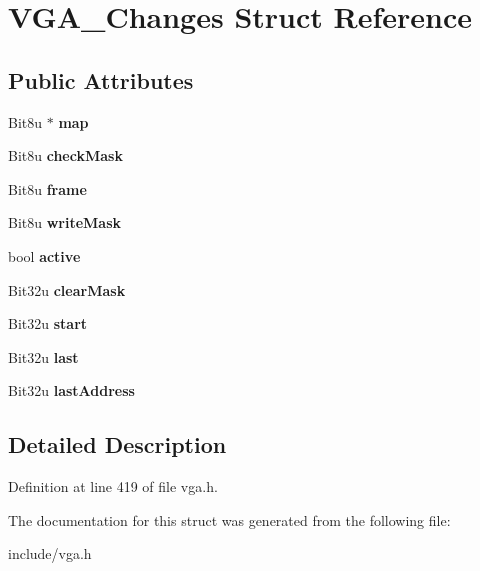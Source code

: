 \hypertarget{structVGA__Changes}{\section{V\-G\-A\-\_\-\-Changes Struct Reference}
\label{structVGA__Changes}
}
\subsection*{Public Attributes}
\begin{DoxyCompactItemize}
\item 
\hypertarget{structVGA__Changes_aae6472354347c41048cfab1219789b64}{Bit8u $\ast$ {\bfseries map}}\label{structVGA__Changes_aae6472354347c41048cfab1219789b64}

\item 
\hypertarget{structVGA__Changes_a6ae67831c523b25bdc21fa4db83afe43}{Bit8u {\bfseries check\-Mask}}\label{structVGA__Changes_a6ae67831c523b25bdc21fa4db83afe43}

\item 
\hypertarget{structVGA__Changes_ac26763f63772c078c7743773f53cde98}{Bit8u {\bfseries frame}}\label{structVGA__Changes_ac26763f63772c078c7743773f53cde98}

\item 
\hypertarget{structVGA__Changes_ad700dfb8efd57be98a89c9204d4af2f7}{Bit8u {\bfseries write\-Mask}}\label{structVGA__Changes_ad700dfb8efd57be98a89c9204d4af2f7}

\item 
\hypertarget{structVGA__Changes_a5e1eb3db4e0041fcaa05d426cf0bcf7b}{bool {\bfseries active}}\label{structVGA__Changes_a5e1eb3db4e0041fcaa05d426cf0bcf7b}

\item 
\hypertarget{structVGA__Changes_a64765a10e9ca419e7fe12ad0cd73f297}{Bit32u {\bfseries clear\-Mask}}\label{structVGA__Changes_a64765a10e9ca419e7fe12ad0cd73f297}

\item 
\hypertarget{structVGA__Changes_adcb1b4110d1643ca21b047ff682124b5}{Bit32u {\bfseries start}}\label{structVGA__Changes_adcb1b4110d1643ca21b047ff682124b5}

\item 
\hypertarget{structVGA__Changes_af476a9d8e176d26e02c9297300ed8baf}{Bit32u {\bfseries last}}\label{structVGA__Changes_af476a9d8e176d26e02c9297300ed8baf}

\item 
\hypertarget{structVGA__Changes_a65c792a3ddf72b6a016b3b221857f3b7}{Bit32u {\bfseries last\-Address}}\label{structVGA__Changes_a65c792a3ddf72b6a016b3b221857f3b7}

\end{DoxyCompactItemize}


\subsection{Detailed Description}


Definition at line 419 of file vga.\-h.



The documentation for this struct was generated from the following file\-:\begin{DoxyCompactItemize}
\item 
include/vga.\-h\end{DoxyCompactItemize}
